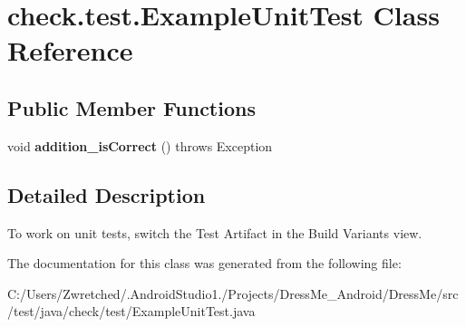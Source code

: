 \hypertarget{classcheck_1_1test_1_1_example_unit_test}{}\section{check.\+test.\+Example\+Unit\+Test Class Reference}
\label{classcheck_1_1test_1_1_example_unit_test}
\subsection*{Public Member Functions}
\begin{DoxyCompactItemize}
\item 
\hypertarget{classcheck_1_1test_1_1_example_unit_test_af02e9b47c9a7e6068042217e8371135b}{}void {\bfseries addition\+\_\+is\+Correct} ()  throws Exception \label{classcheck_1_1test_1_1_example_unit_test_af02e9b47c9a7e6068042217e8371135b}

\end{DoxyCompactItemize}


\subsection{Detailed Description}
To work on unit tests, switch the Test Artifact in the Build Variants view. 

The documentation for this class was generated from the following file\+:\begin{DoxyCompactItemize}
\item 
C\+:/\+Users/\+Zwretched/.\+Android\+Studio1./\+Projects/\+Dress\+Me\+\_\+\+Android/\+Dress\+Me/src/test/java/check/test/Example\+Unit\+Test.\+java\end{DoxyCompactItemize}
